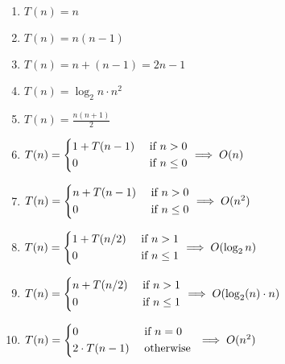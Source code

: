 \documentclass[a4paper]{report}
\begin{document}
\begin{enumerate}
    \item $T(n) = n$
    \item $T(n) = n(n-1)$
    \item $T(n) = n + (n-1) = 2n-1$
    \item $T(n) = \log_{2}n \cdot n^{2}$
    \item $T(n) = \frac{n(n+1)}{2}$
    \item $T(n) = \begin{dcases}
                  1 + T(n-1) & \text{ if } n > 0   \\
                  0          & \text{ if } n \le 0 \\
              \end{dcases}  \implies O(n)$
    \item $T(n) = \begin{dcases}
                  n + T(n-1) & \text{ if } n > 0   \\
                  0          & \text{ if } n \le 0 \\
              \end{dcases}  \implies O(n^{2})$
    \item $T(n) = \begin{dcases}
                  1 + T(n/2) & \text{ if } n > 1   \\
                  0          & \text{ if } n \le 1 \\
              \end{dcases}  \implies O(\log_{2}n)$
    \item $T(n) = \begin{dcases}
                  n + T(n/2) & \text{ if } n > 1   \\
                  0          & \text{ if } n \le 1 \\
              \end{dcases}  \implies O(\log_{2}(n) \cdot n)$
    \item $T(n) = \begin{dcases}
                  0              & \text{ if } n = 0  \\
                  2 \cdot T(n-1) & \text{ otherwise } \\
              \end{dcases}  \implies O(n^{2})$
\end{enumerate}
\end{document}
